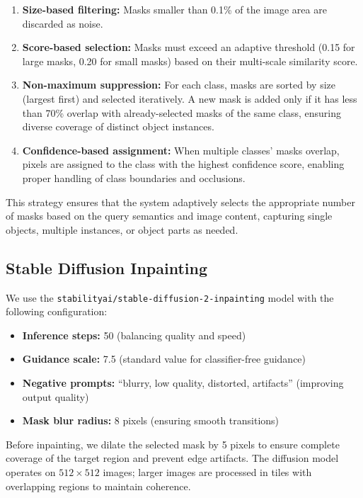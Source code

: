 \begin{enumerate}
    \item \textbf{Size-based filtering:} Masks smaller than 0.1\% of the image area are discarded as noise.

    \item \textbf{Score-based selection:} Masks must exceed an adaptive threshold (0.15 for large masks, 0.20 for small masks) based on their multi-scale similarity score.

    \item \textbf{Non-maximum suppression:} For each class, masks are sorted by size (largest first) and selected iteratively. A new mask is added only if it has less than 70\% overlap with already-selected masks of the same class, ensuring diverse coverage of distinct object instances.

    \item \textbf{Confidence-based assignment:} When multiple classes' masks overlap, pixels are assigned to the class with the highest confidence score, enabling proper handling of class boundaries and occlusions.
\end{enumerate}

This strategy ensures that the system adaptively selects the appropriate number of masks based on the query semantics and image content, capturing single objects, multiple instances, or object parts as needed.

\subsection{Stable Diffusion Inpainting}

We use the \texttt{stabilityai/stable-diffusion-2-inpainting} model with the following configuration:

\begin{itemize}
    \item \textbf{Inference steps:} 50 (balancing quality and speed)
    \item \textbf{Guidance scale:} 7.5 (standard value for classifier-free guidance)
    \item \textbf{Negative prompts:} ``blurry, low quality, distorted, artifacts'' (improving output quality)
    \item \textbf{Mask blur radius:} 8 pixels (ensuring smooth transitions)
\end{itemize}

Before inpainting, we dilate the selected mask by 5 pixels to ensure complete coverage of the target region and prevent edge artifacts. The diffusion model operates on $512 \times 512$ images; larger images are processed in tiles with overlapping regions to maintain coherence.

